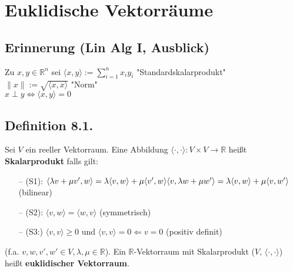 \documentclass[a4paper, 12pt]{extarticle}
\newcommand{\skalar}[2] {
	\langle #1, #2\rangle
}
\newcommand{\genskalar}{
	\skalar{\cdot }{\cdot }
}
\begin{document}
\section{Euklidische Vektorräume}
\subsection*{Erinnerung (Lin Alg I, Ausblick)}
Zu $x, y \in \mathbb{R}^n$ sei ${\skalar{x}{y}} := \sum_{i=1}^{n}x_iy_i$ "Standardskalarprodukt"\\
$\parallel x\parallel := \sqrt{\skalar{x}{x}}$ "Norm"\\
$x \perp y \Leftrightarrow {\skalar{x}{y}} = 0$

\subsection*{Definition 8.1.}
Sei $V$ ein reeller Vektorraum. Eine Abbildung $\genskalar: V \times V \longrightarrow \mathbb{R}$ heißt \textbf{Skalarprodukt} falls gilt:
\begin{enumerate}
	\item [--] (S1): ${\skalar{\lambda v + \mu v'}{w}} = \lambda {\skalar{v}{w}} + \mu {\skalar{v'}{w}}\\
	{\skalar{v}{\lambda w + \mu w'}} = \lambda {\skalar{v}{w}} + \mu {\skalar{v}{w'}}$ (bilinear)
	\item [--] (S2): ${\skalar{v}{w}} = {\skalar{w}{v}}$ (symmetrisch)
	\item[--] (S3:) ${\skalar{v}{v}} \geq 0$ und ${\skalar{v}{v}} = 0 \Leftarrow v = 0$ (positiv definit)
\end{enumerate}

(f.a. $v, w, v', w' \in V, \lambda, \mu \in \mathbb{R}$).
Ein $\mathbb{R}$-Vektorraum mit Skalarprodukt ($V$, $\genskalar$) heißt \textbf{euklidischer Vektorraum}.
\end{document}
